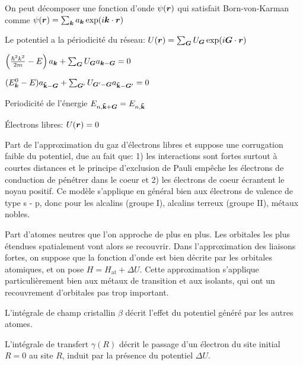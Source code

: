 \begin{squishlist}
    \item On peut décomposer une fonction d'onde $\psi(\bm{r})$ qui satisfait Born-von-Karman comme $\psi(\bm{r}) = \sum_{\bm{k}} a_{\bm{k}} \exp(i \bm{k} \cdot \bm{r})$
    \item Le potentiel a la périodicité du réseau: $U(\bm{r}) = \sum_{\bm{G}} U_{\bm{G}} \exp(i \bm{G} \cdot \bm{r})$
    \item $\left(\frac{\hbar^2 k^2}{2m} - E\right)a_{\bm{k}} + \sum_{\bm{G}}U_{\bm{G}}a_{\bm{k} - \bm{G}}  = 0$
    \item $(E_{\bm{k}}^0 - E)a_{\mathbf{{\tilde{k}}} - \bm{G}} + \sum_{\bm{G}'}U_{\bm{G}' - \bm{G}}a_{\mathbf{\tilde{k}} - \bm{G}'}  = 0$
    \item Periodicité de l'énergie $ E_{n,\mathbf{\tilde{k}} + \bm{G}} = E_{n,\mathbf{\tilde{k}}}$
    \item Électrons libres: $U(\bm{r}) = 0$
\end{squishlist}

Part de l'approximation du gaz d'électrons libres et suppose une corrugation faible du potentiel, due au fait que: 
1) les interactions sont fortes surtout à courtes distances et le principe d'exclusion de Pauli empêche les électrons de conduction de pénétrer dans le coeur et 
2) les électrons de coeur écrantent le noyau positif. Ce modèle s'applique en général bien aux électrons de valence de type s - p, donc pour les alcalins (groupe I), alcalins terreux (groupe II), métaux nobles.
\begin{squishlist}
    \item 
\end{squishlist}

Part d'atomes neutres que l'on approche de plus en plus.
Les orbitales les plus étendues spatialement vont alors se recouvrir. Dans l'approximation
des liaisons fortes, on suppose que la fonction d'onde est bien décrite par les orbitales
atomiques, et on pose $H = H_{\text{at}} + \Delta U$. 
Cette approximation s'applique particulièrement
bien aux métaux de transition et aux isolants, qui ont un recouvrement d'orbitales pas
trop important.
\begin{squishlist}
    \item L'intégrale de champ cristallin $\beta$ décrit l'effet du potentiel généré par les autres atomes.
    \item L'intégrale de transfert $\gamma(R)$ décrit le passage d'un électron du site initial $R = 0$ au site $R$, induit par la présence du potentiel $\Delta U$.
\end{squishlist}